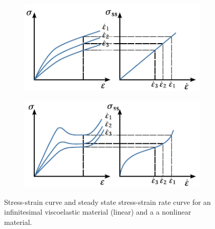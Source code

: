 \begin{figure}[hbtp]
\centering
  \begin{subfigure}[b]{0.49\textwidth}
            \centering
            \includegraphics[width=\textwidth]{figures/constant_strain_rate_expected}
            \caption{}
            \label{subfig:constant_strain_rate_expected}
    \end{subfigure} \hfill
    \begin{subfigure}[b]{0.49\textwidth}
            \centering
            \includegraphics[width=\textwidth]{figures/constant_strain_rate_nonlinear}
            \caption{}
            \label{subfig:constant_strain_rate_nonlinear}
    \end{subfigure}
  \caption{Stress-strain curve and steady state stress-strain rate curve for  an infinitesimal viscoelastic material (linear) and a  a nonlinear material.}
\label{fig:constant_strain_rate_results}
\end{figure}

